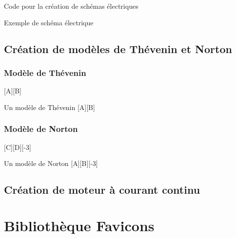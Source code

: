{\begin{Latex}{Code pour la création de schémas électriques}
\begin{schema} {Exemple de schéma électrique}
    
    
    
              
    \end{schema}
  \end{Latex}
  

\section{Création de modèles de Thévenin et Norton}


\subsection{Modèle de Thévenin}

[A][B]

\begin{Latex}{Un modèle de Thévenin}
  [A][B]
\end{Latex}

\subsection{Modèle de Norton}

[C][D][-3]

\begin{Latex}{Un modèle de Norton}
  [A][B][-3]
\end{Latex}

\section{Création de moteur à courant continu}


\chapter{Bibliothèque Favicons} \label{Fonts}

}
